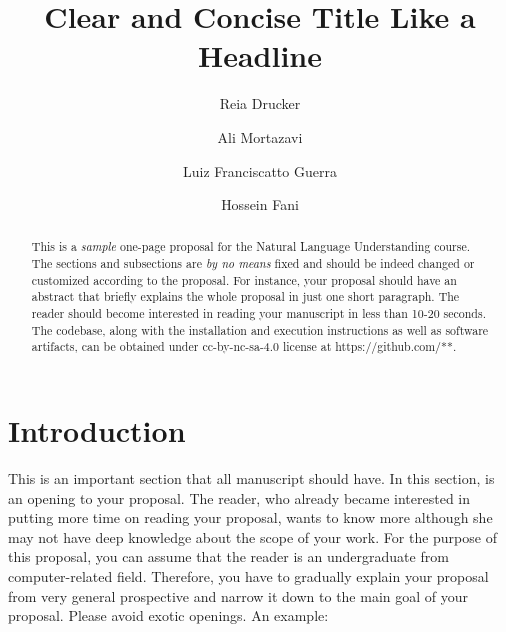 \documentclass[sigconf]{acmart}
\begin{document}
\title{Clear and Concise Title Like a Headline }
\author{Reia Drucker}
\author{Ali Mortazavi}
\author{Luiz Franciscatto Guerra}

\author{Hossein Fani}

\begin{abstract}
{\color{blue}This is a \textit{sample} one-page proposal for the Natural Language Understanding course. The sections and subsections are \textit{by no means} fixed and should be indeed changed or customized according to the proposal. For instance, your proposal should have an abstract that briefly explains the whole proposal in just one short paragraph. The reader should become interested in reading your manuscript in less than 10-20 seconds. The codebase, along with the installation and execution instructions as well as software artifacts, can be obtained under cc-by-nc-sa-4.0 license at https://github.com/**.}
\end{abstract}

\maketitle

\section{Introduction}
{\color{blue}This is an important section that all manuscript should have. In this section, is an opening to your proposal. The reader, who already became interested in putting more time on reading your proposal, wants to know more although she may not have deep knowledge about the scope of your work. For the purpose of this proposal, you can assume that the reader is an undergraduate from computer-related field. Therefore, you have to gradually explain your proposal from very general prospective and narrow it down to the  main goal of your proposal. Please avoid exotic openings. An example:}
\end{document}
